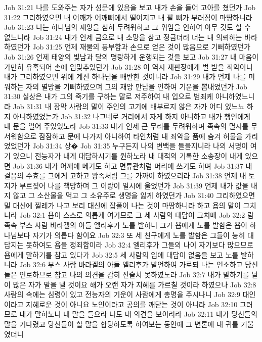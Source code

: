 Job 31:21  나를 도와주는 자가 성문에 있음을 보고 내가 손을 들어 고아를 쳤던가
Job 31:22  그리하였으면 내 어깨가 어깨뼈에서 떨어지고 내 팔 뼈가 부러짐이 마땅하니라
Job 31:23  나는 하나님의 재앙을 심히 두려워하고 그 위엄을 인하여 아무 것도 할 수 없느니라
Job 31:24  내가 언제 금으로 내 소망을 삼고 정금더러 너는 내 의뢰하는 바라 하였던가
Job 31:25  언제 재물의 풍부함과 손으로 얻은 것이 많음으로 기뻐하였던가
Job 31:26  언제 태양의 빛남과 달의 명랑하게 운행되는 것을 보고
Job 31:27  내 마음이 가만히 유혹되어 손에 입맞추었던가
Job 31:28  이 역시 재판장에게 벌 받을 죄악이니 내가 그리하였으면 위에 계신 하나님을 배반한 것이니라
Job 31:29  내가 언제 나를 미워하는 자의 멸망을 기뻐하였으며 그의 재앙 만남을 인하여 기운을 뽐내었던가
Job 31:30  실상은 내가 그의 죽기를 구하는 말로 저주하여 내 입으로 범죄케 아니하였느니라
Job 31:31  내 장막 사람의 말이 주인의 고기에 배부르지 않은 자가 어디 있느뇨 하지 아니하였었는가
Job 31:32  나그네로 거리에서 자게 하지 아니하고 내가 행인에게 내 문을 열어 주었었노라
Job 31:33  내가 언제 큰 무리를 두려워하며 족속의 멸시를 무서워함으로 잠잠하고 문에 나가지 아니하여 타인처럼 내 죄악을 품에 숨겨 허물을 가리었었던가
Job 31:34  상�
Job 31:35  누구든지 나의 변백을 들을지니라 나의 서명이 여기 있으니 전능자가 내게 대답하시기를 원하노라 내 대적의 기록한 소송장이 내게 있으면
Job 31:36  내가 어깨에 메기도 하고 면류관처럼 머리에 쓰기도 하며
Job 31:37  내 걸음의 수효를 그에게 고하고 왕족처럼 그를 가까이 하였으리라
Job 31:38  언제 내 토지가 부르짖어 나를 책망하며 그 이랑이 일시에 울었던가
Job 31:39  언제 내가 값을 내지 않고 그 소산물을 먹고 그 소유주로 생명을 잃게 하였던가
Job 31:40  그리하였으면 밀 대신에 찔레가 나고 보리 대신에 잡풀이 나는 것이 마땅하니라 하고 욥의 말이 그치니라
Job 32:1  욥이 스스로 의롭게 여기므로 그 세 사람의 대답이 그치매
Job 32:2  람 족속 부스 사람 바라겔의 아들 엘리후가 노를 발하니 그가 욥에게 노를 발함은 욥이 하나님보다 자기가 의롭다 함이요
Job 32:3  또 세 친구에게 노를 발함은 그들이 능히 대답지는 못하여도 욥을 정죄함이라
Job 32:4  엘리후가 그들의 나이 자기보다 많으므로 욥에게 말하기를 참고 있다가
Job 32:5  세 사람의 입에 대답이 없음을 보고 노를 발하니라
Job 32:6  부스 사람 바라겔의 아들 엘리후가 발언하여 가로되 나는 연소하고 당신들은 연로하므로 참고 나의 의견을 감히 진술치 못하였노라
Job 32:7  내가 말하기를 날이 많은 자가 말을 낼 것이요 해가 오랜 자가 지혜를 가르칠 것이라 하였으나
Job 32:8  사람의 속에는 심령이 있고 전능자의 기운이 사람에게 총명을 주시나니
Job 32:9  대인이라고 지혜로운 것이 아니요 노인이라고 공의를 깨닫는 것이 아니라
Job 32:10  그러므로 내가 말하노니 내 말을 들으라 나도 내 의견을 보이리라
Job 32:11  내가 당신들의 말을 기다렸고 당신들이 할 말을 합당하도록 하여보는 동안에 그 변론에 내 귀를 기울였더니

